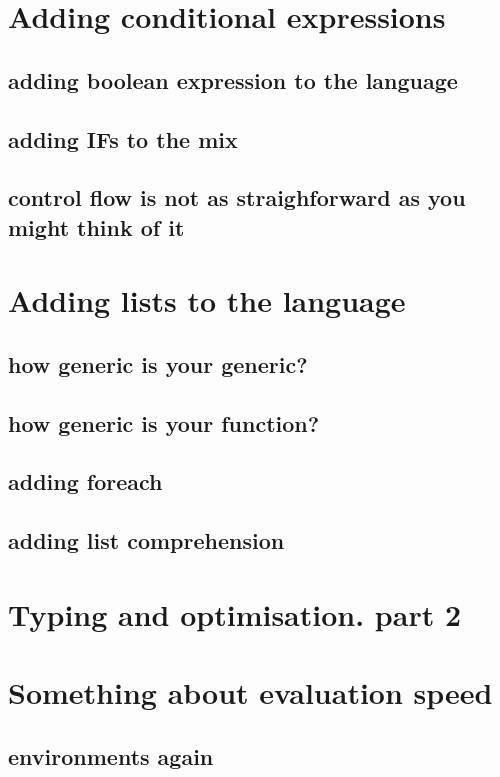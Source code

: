 \documentclass[11pt]{article}
\begin{document}
\section{Adding conditional expressions}
\label{sec:org695f66b}
\subsection{adding boolean expression to the language}
\label{sec:org656d09f}
\subsection{adding IFs to the mix}
\label{sec:orgc5cc7c0}
\subsection{control flow is not as straighforward as you might think of it}
\label{sec:orgf908723}
\section{Adding lists to the language}
\label{sec:org3902d93}
\subsection{how generic is your generic?}
\label{sec:orgbce4c72}
\subsection{how generic is your function?}
\label{sec:orgef3af4b}
\subsection{adding foreach}
\label{sec:orgcb94904}
\subsection{adding list comprehension}
\label{sec:org00c4ace}
\section{Typing and optimisation. part 2}
\label{sec:org5eb7408}
\section{Something about evaluation speed}
\label{sec:org574469e}

\subsection{environments again}
\label{sec:org4c60c03}
\end{document}
